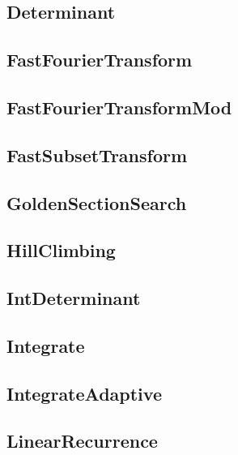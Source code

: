 \subsection{Determinant}
\raggedbottom
\hrulefill
\subsection{FastFourierTransform}
\raggedbottom
\hrulefill
\subsection{FastFourierTransformMod}
\raggedbottom
\hrulefill
\subsection{FastSubsetTransform}
\raggedbottom
\hrulefill
\subsection{GoldenSectionSearch}
\raggedbottom
\hrulefill
\subsection{HillClimbing}
\raggedbottom
\hrulefill
\subsection{IntDeterminant}
\raggedbottom
\hrulefill
\subsection{Integrate}
\raggedbottom
\hrulefill
\subsection{IntegrateAdaptive}
\raggedbottom
\hrulefill
\subsection{LinearRecurrence}
\raggedbottom
\hrulefill
